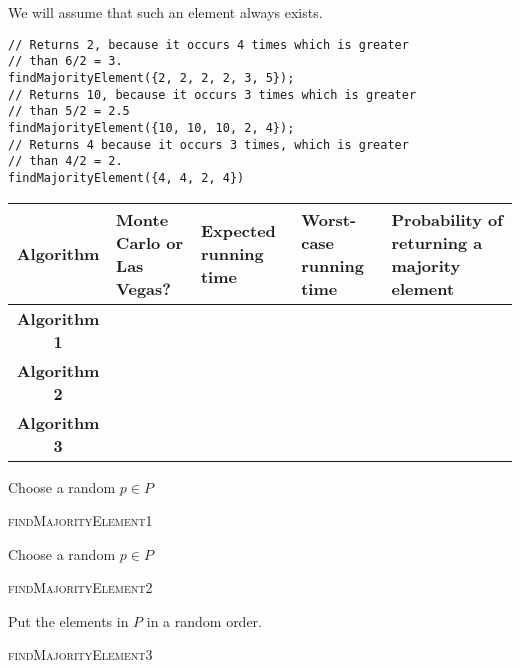 \documentclass [12pt]{article}
\begin{document}
We will assume that such an element always exists.

\vspace{2em}
\begin{verbatim}
// Returns 2, because it occurs 4 times which is greater
// than 6/2 = 3.
findMajorityElement({2, 2, 2, 2, 3, 5});
// Returns 10, because it occurs 3 times which is greater
// than 5/2 = 2.5
findMajorityElement({10, 10, 10, 2, 4});
// Returns 4 because it occurs 3 times, which is greater
// than 4/2 = 2.
findMajorityElement({4, 4, 2, 4})
\end{verbatim}

\vspace{2em}
\begin{center} 
\begin{tabular}{|c|p{3cm}|p{2cm}|p{2cm}|p{4cm}|}
\hline 
Algorithm & Monte Carlo or Las Vegas? & Expected running time & Worst-case running time & Probability of returning a majority element \\
\hline 
\textbf {Algorithm 1} & & & & \\ 
\hline 
\textbf {Algorithm 2} & & & & \\
\hline 
\textbf {Algorithm 3} & & & & \\ 
\hline 
\end{tabular}
\end{center}

 \newpage 

\begin{algorithm}[H]
     { 
        Choose a random $p \in P$\;
    } 
    \caption {\textsc {findMajorityElement1}}
\end{algorithm} 

\begin{algorithm}[H]
     { 
        Choose a random $p \in P$\;
    }
    \caption {\textsc {findMajorityElement2}}
\end{algorithm} 

\begin{algorithm}[H]
    Put the elements in $P$ in a random order.\; 
     {
    }
    \caption {\textsc {findMajorityElement3}}
\end{algorithm} 
\end{document}
